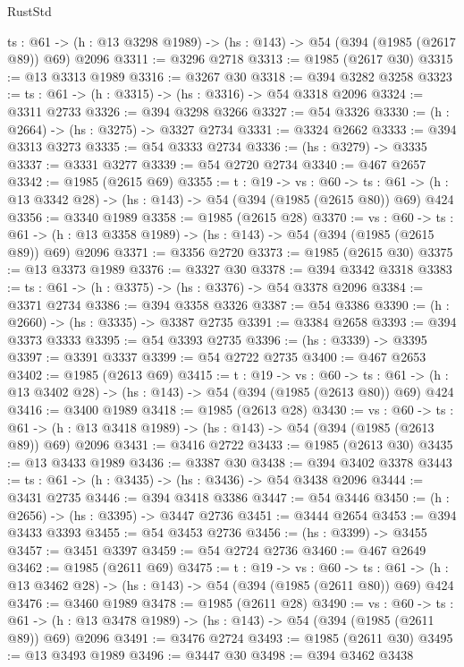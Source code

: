 \begin{lexlean}{RustStd}
\begin{coremodule}
  {ts : @61} -> (h : @13 @3298 @1989) -> (hs : @143) -> @54 (@394 (@1985 (@2617 @89)) @69) @2096
@3311 := @3296 @2718
@3313 := @1985 (@2617 @30)
@3315 := @13 @3313 @1989
@3316 := @3267 @30
@3318 := @394 @3282 @3258
@3323 := {ts : @61} -> (h : @3315) -> (hs : @3316) -> @54 @3318 @2096
@3324 := @3311 @2733
@3326 := @394 @3298 @3266
@3327 := @54 @3326
@3330 := (h : @2664) -> (hs : @3275) -> @3327 @2734
@3331 := @3324 @2662
@3333 := @394 @3313 @3273
@3335 := @54 @3333 @2734
@3336 := (hs : @3279) -> @3335
@3337 := @3331 @3277
@3339 := @54 @2720 @2734
@3340 := @467 @2657
@3342 := @1985 (@2615 @69)
@3355 := {t : @19} ->
  {vs : @60} ->
  {ts : @61} -> (h : @13 @3342 @28) -> (hs : @143) -> @54 (@394 (@1985 (@2615 @80)) @69) @424
@3356 := @3340 @1989
@3358 := @1985 (@2615 @28)
@3370 := {vs : @60} ->
  {ts : @61} -> (h : @13 @3358 @1989) -> (hs : @143) -> @54 (@394 (@1985 (@2615 @89)) @69) @2096
@3371 := @3356 @2720
@3373 := @1985 (@2615 @30)
@3375 := @13 @3373 @1989
@3376 := @3327 @30
@3378 := @394 @3342 @3318
@3383 := {ts : @61} -> (h : @3375) -> (hs : @3376) -> @54 @3378 @2096
@3384 := @3371 @2734
@3386 := @394 @3358 @3326
@3387 := @54 @3386
@3390 := (h : @2660) -> (hs : @3335) -> @3387 @2735
@3391 := @3384 @2658
@3393 := @394 @3373 @3333
@3395 := @54 @3393 @2735
@3396 := (hs : @3339) -> @3395
@3397 := @3391 @3337
@3399 := @54 @2722 @2735
@3400 := @467 @2653
@3402 := @1985 (@2613 @69)
@3415 := {t : @19} ->
  {vs : @60} ->
  {ts : @61} -> (h : @13 @3402 @28) -> (hs : @143) -> @54 (@394 (@1985 (@2613 @80)) @69) @424
@3416 := @3400 @1989
@3418 := @1985 (@2613 @28)
@3430 := {vs : @60} ->
  {ts : @61} -> (h : @13 @3418 @1989) -> (hs : @143) -> @54 (@394 (@1985 (@2613 @89)) @69) @2096
@3431 := @3416 @2722
@3433 := @1985 (@2613 @30)
@3435 := @13 @3433 @1989
@3436 := @3387 @30
@3438 := @394 @3402 @3378
@3443 := {ts : @61} -> (h : @3435) -> (hs : @3436) -> @54 @3438 @2096
@3444 := @3431 @2735
@3446 := @394 @3418 @3386
@3447 := @54 @3446
@3450 := (h : @2656) -> (hs : @3395) -> @3447 @2736
@3451 := @3444 @2654
@3453 := @394 @3433 @3393
@3455 := @54 @3453 @2736
@3456 := (hs : @3399) -> @3455
@3457 := @3451 @3397
@3459 := @54 @2724 @2736
@3460 := @467 @2649
@3462 := @1985 (@2611 @69)
@3475 := {t : @19} ->
  {vs : @60} ->
  {ts : @61} -> (h : @13 @3462 @28) -> (hs : @143) -> @54 (@394 (@1985 (@2611 @80)) @69) @424
@3476 := @3460 @1989
@3478 := @1985 (@2611 @28)
@3490 := {vs : @60} ->
  {ts : @61} -> (h : @13 @3478 @1989) -> (hs : @143) -> @54 (@394 (@1985 (@2611 @89)) @69) @2096
@3491 := @3476 @2724
@3493 := @1985 (@2611 @30)
@3495 := @13 @3493 @1989
@3496 := @3447 @30
@3498 := @394 @3462 @3438

\end{coremodule}
\end{lexlean}
